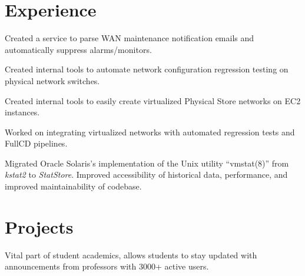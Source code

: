 \documentclass[]{resume}
\begin{document}
\begin{minipage}[t]{0.70\textwidth}

\section{Experience}

\subsectionsep
\begin{tightemize}
\item Created a service to parse WAN maintenance notification emails and
automatically suppress alarms/monitors.
\item Created internal tools to automate network configuration regression
testing on physical network switches.
\item Created internal tools to easily create virtualized Physical Store
networks on EC2 instances.
\item Worked on integrating virtualized networks with automated regression
tests and FullCD pipelines.
\end{tightemize}
\subsectionsep

\begin{tightemize}
\item Migrated Oracle Solaris's implementation of the Unix
utility ``vmstat(8)'' from \textit{kstat2} to \textit{StatStore}. Improved accessibility of historical data, performance, and improved maintainability of codebase.
\end{tightemize}

\section{Projects}
\begin{tightemize}
\item Vital part of student academics, allows students to stay updated with announcements from
professors with 3000+ active users.
\end{tightemize}
\subsectionsep


\end{minipage}
\end{document}
